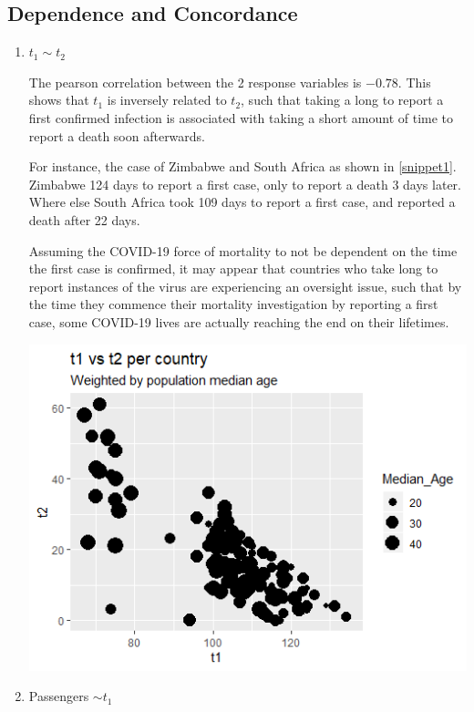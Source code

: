 \documentclass[]{report}
\begin{document}
\newpage

\subsection{Dependence and Concordance}

\begin{enumerate}
	\item{$t_1 \sim t_2$}
	
	The pearson correlation between the 2 response variables is  $-0.78$. This shows that $t_1$ is inversely related to $t_2$, such that taking a long to report a first confirmed infection is associated with taking a short amount of time to report a death soon afterwards.
	
	For instance, the case of Zimbabwe and South Africa as shown in \ref{snippet1}. Zimbabwe 124 days to report a first case, only to report a death 3 days later. Where else South Africa took 109 days to report a first case, and reported a death after 22 days.
	
	Assuming the COVID-19 force of mortality to not be dependent on the time the first case is confirmed, it may appear that countries who take long to report instances of the virus are experiencing an oversight issue, such that by the time they commence their mortality investigation by reporting a first case, some COVID-19 lives are actually reaching the end on their lifetimes.
	
	\includegraphics{t1vt2.png}
	
	\newpage
	
	\item{Passengers $\sim t_1$}
	

\end{enumerate}
\end{document}
